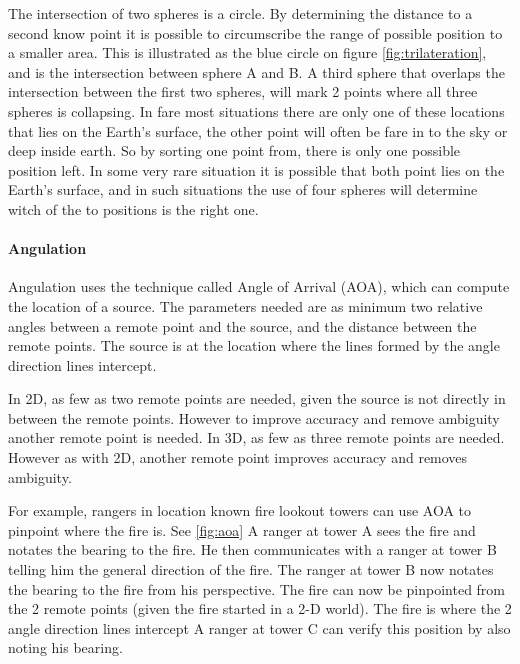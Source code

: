   The intersection of two spheres is a circle. By determining the distance to a second know point it is possible to circumscribe the range of possible position to a smaller area.
  This is illustrated as the blue circle on figure \ref{fig:trilateration}, and is the intersection between sphere A and B.
  A third sphere that overlaps the intersection between the first two spheres, will mark 2 points where all three spheres is collapsing. In fare most situations there are only one of these locations that lies on the Earth's surface, the other point will often be fare in to the sky or deep inside earth. So by sorting one point from, there is only one possible position left. 
  In some very rare situation it is possible that both point lies on the Earth's surface, and in such situations the use of four spheres will determine witch of the to positions is the right one.



  \paragraph{Angulation}

  Angulation uses the technique called Angle of Arrival (AOA), which can compute the location of a source. The parameters needed are as minimum two relative angles between a remote point and the source, and the distance between the remote points. The source is at the location where the lines formed by the angle direction lines intercept. 

  In 2D, as few as two remote points are needed, given the source is not directly in between the remote points. However to improve accuracy and remove ambiguity  another remote point is needed. In 3D, as few as three remote points are needed. However as with 2D, another remote point improves accuracy and removes ambiguity. \cite{Liu2007, Sun2009, Boontrai2009}

  For example, rangers in location known fire lookout towers can use AOA to pinpoint where the fire is. See \cref{fig:aoa} A ranger at tower A sees the fire and notates the bearing to the fire. He then communicates with a ranger at tower B telling him the general direction of the fire. The ranger at tower B now notates the bearing to the fire from his perspective. The fire can now be pinpointed from the 2 remote points (given the fire started in a 2-D world). The fire is where the 2 angle direction lines intercept A ranger at tower C can verify this position by also noting his bearing. \cite{compassdude_triangulation}

